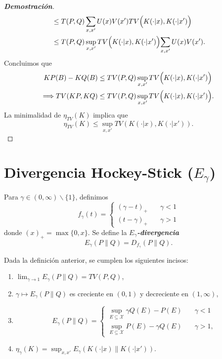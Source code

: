 \begin{proof}[\textbf{Demostraci\'on}]
\begin{align*}
    &\leq T(P,Q)\sum_{x,x'}U(x)V(x')TV\Bigl(K(\cdot|x),K(\cdot|x')\Bigl)\\
    &\leq T(P,Q)\sup_{x,x'}TV\Bigl(K(\cdot|x),K(\cdot|x')\Bigl)\sum_{x,x'}U(x)V(x').
\end{align*}
Concluimos que 
\begin{align*}
    KP(B)-KQ(B)&\leq TV(P,Q)\sup_{x,x'}TV\Bigl(K(\cdot|x),K(\cdot|x')\Bigl)\\
    \Longrightarrow TV(KP,KQ)&\leq TV(P,Q)\sup_{x,x'}TV\Bigl(K(\cdot|x),K(\cdot|x')\Bigl).
\end{align*}
La minimalidad de $\eta_{TV}(K)$ implica que 
\begin{equation*}
    \eta_{TV}(K)\leq\sup_{x,x'}TV(K(\cdot|x),K(\cdot|x')).
\end{equation*}
\end{proof}

\section{Divergencia Hockey-Stick ($E_\gamma$)}

\begin{definition}
    Para $\gamma\in(0,\infty)\backslash\{1\}$, definimos
    \begin{equation*}
        f_\gamma(t)=\begin{cases}
        (\gamma-t)_+&\quad\gamma<1\\
        (t-\gamma)_+&\quad\gamma>1
        \end{cases}
    \end{equation*}
    donde $(x)_+=\max\{0,x\}$. Se define la \textbf{\textit{$E_\gamma$-divergencia}}
    \begin{equation*}
        E_\gamma(P\|Q)=D_{f_\gamma}(P\|Q).
    \end{equation*}
\end{definition}

\begin{theorem}
Dada la definici\'on anterior, se cumplen los siguientes incisos: 
\begin{enumerate}[label=(\alph*)]
    \item $\lim_{\gamma\to1}E_\gamma(P\|Q)=TV(P,Q)$,
    \item $\gamma\mapsto E_\gamma(P\|Q)$ es creciente en $(0,1)$ y decreciente en $(1,\infty)$,
    \item 
    \begin{equation*}
        E_\gamma(P\|Q)=\begin{cases}
        \sup_{E\subseteq\mathcal{X}}\gamma Q(E)-P(E)&\quad\gamma<1\\
        \sup_{E\subseteq\mathcal{X}}P(E)-\gamma Q(E)&\quad\gamma>1,
        \end{cases}
    \end{equation*}
    \item $\eta_\gamma(K)=\sup_{x,x'}E_\gamma(K(\cdot|x)\|K(\cdot|x'))$.
\end{enumerate}    
\end{theorem}

